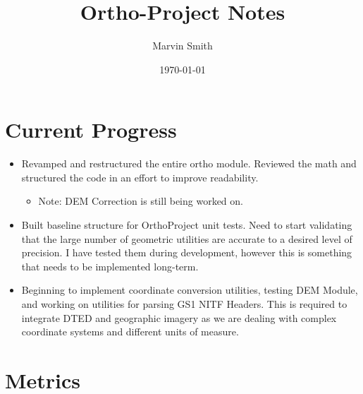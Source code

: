 \documentclass[12pt]{report}
\title{Ortho-Project Notes}
\author{Marvin Smith}
\date{\today}
\begin{document}
\maketitle

\section*{Current Progress}

\begin{itemize}
\item Revamped and restructured the entire ortho module. Reviewed the math and structured the code in an 
      effort to improve readability. 
      \begin{itemize}
      \item Note: DEM Correction is still being worked on.
      \end{itemize}
\item Built baseline structure for OrthoProject unit tests.  Need to start validating that the large number
of geometric utilities are accurate to a desired level of precision.  I have tested them during development, however this is something that 
needs to be implemented long-term. 
\item Beginning to implement coordinate conversion utilities, testing DEM Module, and working on utilities for 
parsing GS1 NITF Headers.  This is required to integrate DTED and geographic imagery as we are dealing with 
complex coordinate systems and different units of measure.
\end{itemize}

\section*{Metrics}
\end{document}
